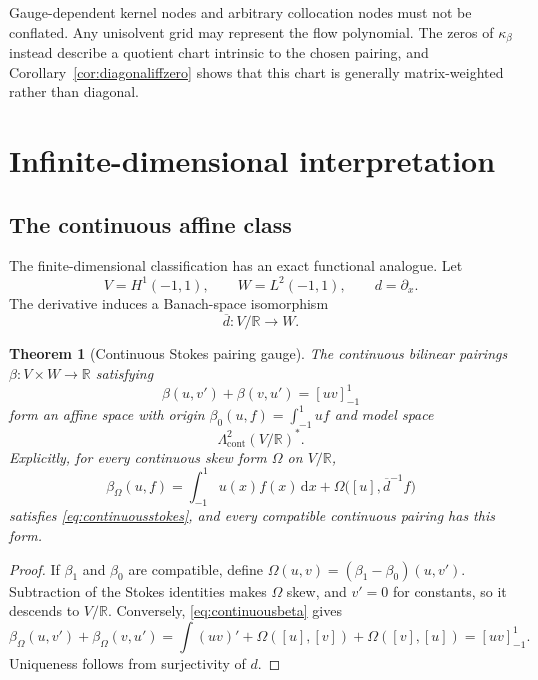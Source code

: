 \documentclass[11pt,a4paper]{article}
\newtheorem{theorem}{Theorem}[section]
\theoremstyle{definition}
\theoremstyle{remark}
\newcommand{\R}{\mathbb{R}}
\newcommand{\dd}{\,\mathrm{d}}
\newcommand{\bracket}[1]{\left[#1\right]_{-1}^{1}}
\begin{document}
Gauge-dependent kernel nodes and arbitrary collocation nodes must not be conflated.  Any
unisolvent grid may represent the flow polynomial.  The zeros of $\kappa_\beta$ instead
describe a quotient chart intrinsic to the chosen pairing, and Corollary~\ref{cor:diagonaliffzero}
shows that this chart is generally matrix-weighted rather than diagonal.

\section{Infinite-dimensional interpretation}\label{sec:continuum}

\subsection{The continuous affine class}

The finite-dimensional classification has an exact functional analogue.  Let
\[
 V=H^1(-1,1),\qquad W=L^2(-1,1),\qquad d=\partial_x.
\]
The derivative induces a Banach-space isomorphism
\[
 \overline d:V/\R\longrightarrow W.
\]

\begin{theorem}[Continuous Stokes pairing gauge]\label{thm:continuous}
The continuous bilinear pairings $\beta:V\times W\to\R$ satisfying
\begin{equation}\label{eq:continuousstokes}
 \beta(u,v')+\beta(v,u')=\bracket{uv}
\end{equation}
form an affine space with origin
$\beta_0(u,f)=\int_{-1}^{1}uf$ and model space
\[
 \Lambda^2_{\mathrm{cont}}(V/\R)^*.
\]
Explicitly, for every continuous skew form $\Omega$ on $V/\R$,
\begin{equation}\label{eq:continuousbeta}
 \beta_\Omega(u,f)=\int_{-1}^{1}u(x)f(x)\dd x
 +\Omega\bigl([u],\overline d^{-1}f\bigr)
\end{equation}
satisfies \eqref{eq:continuousstokes}, and every compatible continuous pairing has this form.
\end{theorem}

\begin{proof}
If $\beta_1$ and $\beta_0$ are compatible, define
$\Omega(u,v)=(\beta_1-\beta_0)(u,v')$.  Subtraction of the Stokes identities makes $\Omega$
skew, and $v'=0$ for constants, so it descends to $V/\R$.  Conversely,
\eqref{eq:continuousbeta} gives
\[
 \beta_\Omega(u,v')+\beta_\Omega(v,u')
 =\int(uv)'+\Omega([u],[v])+\Omega([v],[u])
 =\bracket{uv}.
\]
Uniqueness follows from surjectivity of $d$.
\end{proof}
\end{document}
